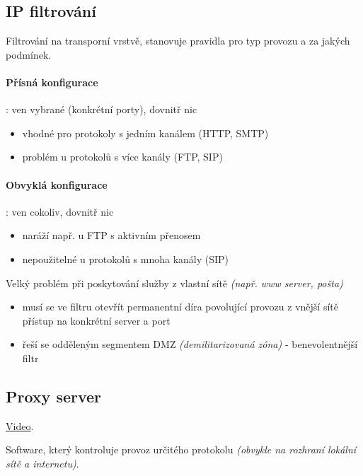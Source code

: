 \documentclass[10pt,a4paper]{article}
\begin{document}
\subsection{IP filtrování}

Filtrování na transporní vrstvě, stanovuje pravidla pro typ provozu a za jakých podmínek.

\paragraph*{Přísná konfigurace}: ven vybrané (konkrétní porty), dovnitř nic

\begin{itemize}
    \item vhodné pro protokoly s jedním kanálem (HTTP, SMTP)    
    \item problém u protokolů s více kanály (FTP, SIP)
\end{itemize}

\paragraph*{Obvyklá konfigurace}: ven cokoliv, dovnitř nic

\begin{itemize}
    \item naráží např. u FTP s aktivním přenosem  
    \item nepoužitelné u protokolů s mnoha kanály (SIP)
\end{itemize}

Velký problém při poskytování služby z vlastní sítě \textit{(např. www server, pošta)}

\begin{itemize}
    \item musí se ve filtru otevřít permanentní díra povolující provozu z vnější sítě přístup na konkrétní server a port
    \item řeší se odděleným segmentem DMZ \textit{(demilitarizovaná zóna)} - benevolentnější filtr
\end{itemize}

\subsection{Proxy server}

\href{https://youtu.be/5cPIukqXe5w}{Video}.

Software, který kontroluje provoz určitého protokolu \textit{(obvykle na rozhraní lokální sítě a internetu)}.
\end{document}
